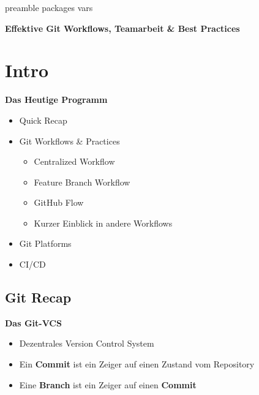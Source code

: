 \RequirePackage{import}
{preamble}
{packages}
{vars}

    \begin{frame}[c]
        \centering
        \Large
        \textbf{Effektive Git Workflows, Teamarbeit \& Best Practices}
    \end{frame}


    \section{Intro}\label{sec:intro}
    \begin{frame}[c]
        \slidehead
        \vspace{-1em}
        \centering
        \large
        \textbf{Das Heutige Programm}
        \vspace{1em}
        \begin{itemize}[<+->]
            \item Quick Recap
            \item Git Workflows \& Practices
            \begin{itemize}
                \item Centralized Workflow
                \item Feature Branch Workflow
                \item GitHub Flow
                \item Kurzer Einblick in andere Workflows
            \end{itemize}
            \item Git Platforms
            \item CI/CD
        \end{itemize}
    \end{frame}

    \subsection{Git Recap}\label{subsec:git-recap}
    \begin{frame}[c]
        \slidehead
        \vspace{-1em}
        \centering
        \large
        \textbf{Das Git-VCS}
        \vspace{1em}
        \begin{itemize}[<+->]
            \item Dezentrales Version Control System
            \item Ein \textbf{Commit} ist ein Zeiger auf einen Zustand vom Repository
            \item Eine \textbf{Branch} ist ein Zeiger auf einen \textbf{Commit}
        \end{itemize}
    \end{frame}


